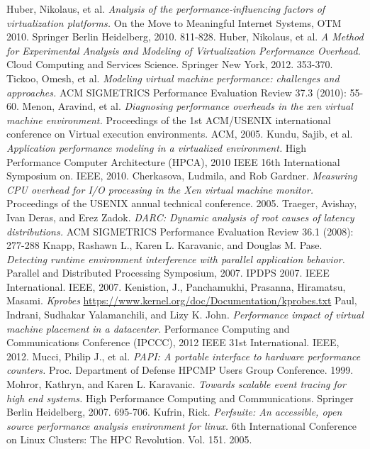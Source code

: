 \begin{thebibliography}{9}
Huber, Nikolaus, et al. \emph{Analysis of the performance-influencing factors of virtualization platforms.}  On the Move to Meaningful Internet Systems, OTM 2010. Springer Berlin Heidelberg, 2010. 811-828.
Huber, Nikolaus, et al. \emph{A Method for Experimental Analysis and Modeling of Virtualization Performance Overhead.}  Cloud Computing and Services Science. Springer New York, 2012. 353-370.
Tickoo, Omesh, et al.  \emph{Modeling virtual machine performance: challenges and approaches.}  ACM SIGMETRICS Performance Evaluation Review 37.3 (2010): 55-60.
 Menon, Aravind, et al.  \emph{Diagnosing performance overheads in the xen virtual machine environment.}  Proceedings of the 1st ACM/USENIX international conference on Virtual execution environments. ACM, 2005.
Kundu, Sajib, et al.  \emph{Application performance modeling in a virtualized environment.}  High Performance Computer Architecture (HPCA), 2010 IEEE 16th International Symposium on. IEEE, 2010.
Cherkasova, Ludmila, and Rob Gardner.  \emph{Measuring CPU overhead for I/O processing in the Xen virtual machine monitor.}  Proceedings of the USENIX annual technical conference. 2005.
Traeger, Avishay, Ivan Deras, and Erez Zadok.  \emph{DARC: Dynamic analysis of root causes of latency distributions.}  ACM SIGMETRICS Performance Evaluation Review 36.1 (2008): 277-288
Knapp, Rashawn L., Karen L. Karavanic, and Douglas M. Pase.  \emph{Detecting runtime environment interference with parallel application behavior.}  Parallel and Distributed Processing Symposium, 2007. IPDPS 2007. IEEE International. IEEE, 2007.
Kenistion, J., Panchamukhi, Prasanna, Hiramatsu, Masami.  \emph{Kprobes}   \url{https://www.kernel.org/doc/Documentation/kprobes.txt}
Paul, Indrani, Sudhakar Yalamanchili, and Lizy K. John.  \emph{Performance impact of virtual machine placement in a datacenter.}  Performance Computing and Communications Conference (IPCCC), 2012 IEEE 31st International. IEEE, 2012.
Mucci, Philip J., et al.  \emph{PAPI: A portable interface to hardware performance counters.}  Proc. Department of Defense HPCMP Users Group Conference. 1999.
Mohror, Kathryn, and Karen L. Karavanic.  \emph{Towards scalable event tracing for high end systems.}  High Performance Computing and Communications. Springer Berlin Heidelberg, 2007. 695-706.
Kufrin, Rick.  \emph{Perfsuite: An accessible, open source performance analysis environment for linux.}  6th International Conference on Linux Clusters: The HPC Revolution. Vol. 151. 2005.

\end{thebibliography}
